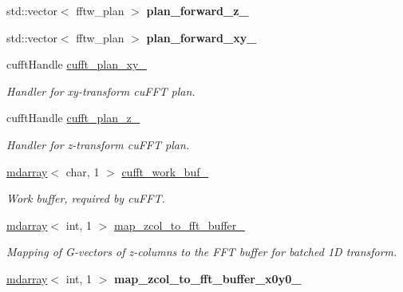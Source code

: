 \begin{DoxyCompactItemize}
\item 
\hypertarget{classsddk_1_1_f_f_t3_d_a181e2020b9cbd3a0fccf53824de3c1d0}{}std\+::vector$<$ fftw\+\_\+plan $>$ {\bfseries plan\+\_\+forward\+\_\+z\+\_\+}\label{classsddk_1_1_f_f_t3_d_a181e2020b9cbd3a0fccf53824de3c1d0}

\item 
\hypertarget{classsddk_1_1_f_f_t3_d_a8ffdabeeb00c5e968e666b34cb366afe}{}std\+::vector$<$ fftw\+\_\+plan $>$ {\bfseries plan\+\_\+forward\+\_\+xy\+\_\+}\label{classsddk_1_1_f_f_t3_d_a8ffdabeeb00c5e968e666b34cb366afe}

\item 
cufft\+Handle \hyperlink{classsddk_1_1_f_f_t3_d_a7819df1c1ea576622c94a078bf34bdbf}{cufft\+\_\+plan\+\_\+xy\+\_\+}
\begin{DoxyCompactList}\small\item\em Handler for xy-\/transform cu\+F\+F\+T plan. \end{DoxyCompactList}\item 
cufft\+Handle \hyperlink{classsddk_1_1_f_f_t3_d_a62151c9726c5dc0ea56f3da721506ac5}{cufft\+\_\+plan\+\_\+z\+\_\+}
\begin{DoxyCompactList}\small\item\em Handler for z-\/transform cu\+F\+F\+T plan. \end{DoxyCompactList}\item 
\hyperlink{classsddk_1_1mdarray}{mdarray}$<$ char, 1 $>$ \hyperlink{classsddk_1_1_f_f_t3_d_ab808ebb702ad2ccb83c1c90afa7e9a1e}{cufft\+\_\+work\+\_\+buf\+\_\+}
\begin{DoxyCompactList}\small\item\em Work buffer, required by cu\+F\+F\+T. \end{DoxyCompactList}\item 
\hyperlink{classsddk_1_1mdarray}{mdarray}$<$ int, 1 $>$ \hyperlink{classsddk_1_1_f_f_t3_d_aa9363e6990496fc3cae2c15c3d930172}{map\+\_\+zcol\+\_\+to\+\_\+fft\+\_\+buffer\+\_\+}
\begin{DoxyCompactList}\small\item\em Mapping of G-\/vectors of z-\/columns to the F\+F\+T buffer for batched 1\+D transform. \end{DoxyCompactList}\item 
\hypertarget{classsddk_1_1_f_f_t3_d_a444be5c1bfdea51e107531874f2d0db4}{}\hyperlink{classsddk_1_1mdarray}{mdarray}$<$ int, 1 $>$ {\bfseries map\+\_\+zcol\+\_\+to\+\_\+fft\+\_\+buffer\+\_\+x0y0\+\_\+}\label{classsddk_1_1_f_f_t3_d_a444be5c1bfdea51e107531874f2d0db4}


\end{DoxyCompactItemize}
